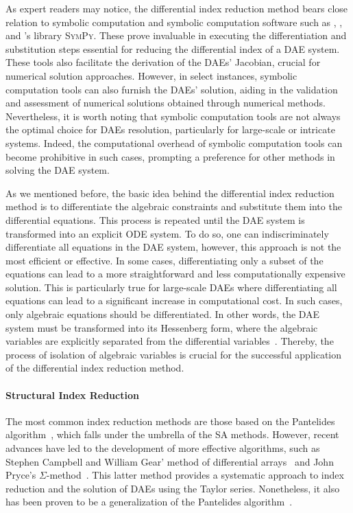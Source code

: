 As expert readers may notice, the differential index reduction method bears close relation to symbolic computation and symbolic computation software such as \Maple{}, \Mathematica{}, and \Python{}'s library \textsc{SymPy}. These prove invaluable in executing the differentiation and substitution steps essential for reducing the differential index of a \ac{DAE} system. These tools also facilitate the derivation of the \acp{DAE}' Jacobian, crucial for numerical solution approaches. However, in select instances, symbolic computation tools can also furnish the \acp{DAE}' solution, aiding in the validation and assessment of numerical solutions obtained through numerical methods. Nevertheless, it is worth noting that symbolic computation tools are not always the optimal choice for \acp{DAE} resolution, particularly for large-scale or intricate systems. Indeed, the computational overhead of symbolic computation tools can become prohibitive in such cases, prompting a preference for other methods in solving the \ac{DAE} system.

As we mentioned before, the basic idea behind the differential index reduction method is to differentiate the algebraic constraints and substitute them into the differential equations. This process is repeated until the \ac{DAE} system is transformed into an explicit \ac{ODE} system. To do so, one can indiscriminately differentiate all equations in the \ac{DAE} system, however, this approach is not the most efficient or effective. In some cases, differentiating only a subset of the equations can lead to a more straightforward and less computationally expensive solution. This is particularly true for large-scale \acp{DAE} where differentiating all equations can lead to a significant increase in computational cost. In such cases, only algebraic equations should be differentiated. In other words, the \ac{DAE} system must be transformed into its Hessenberg form, where the algebraic variables are explicitly separated from the differential variables~\cite{shmoylova2013simplification}. Thereby, the process of isolation of algebraic variables is crucial for the successful application of the differential index reduction method.

\paragraph{Structural Index Reduction}

The most common index reduction methods are those based on the Pantelides algorithm~\cite{pantelides1988consistent}, which falls under the umbrella of the \ac{SA} methods. However, recent advances have led to the development of more effective algorithms, such as Stephen Campbell and William Gear' method of differential arrays~\cite{campbell1995index} and John Pryce's $\Sigma$-method~\cite{pryce1998solving}. This latter method provides a systematic approach to index reduction and the solution of \acp{DAE} using the Taylor series. Nonetheless, it also has been proven to be a generalization of the Pantelides algorithm~\cite{pryce2001simple}.

